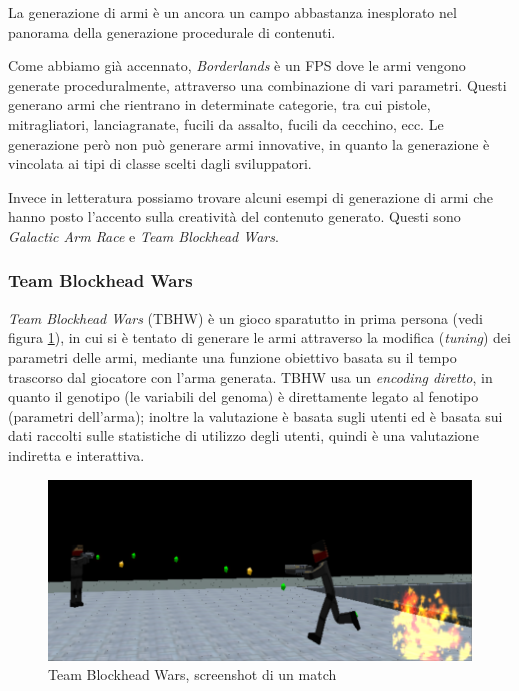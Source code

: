 \documentclass[12pt, italian]{toptesi}
\begin{document}
La generazione di armi è un ancora un campo abbastanza inesplorato nel panorama della generazione procedurale di contenuti.

Come abbiamo già accennato, \emph{Borderlands} è un FPS dove le armi vengono generate proceduralmente, attraverso una combinazione di vari parametri.
Questi generano armi che rientrano in determinate categorie, tra cui pistole, mitragliatori, lanciagranate, fucili da assalto, fucili da cecchino, ecc.
Le generazione però non può generare armi innovative, in quanto la generazione è vincolata ai tipi di classe scelti dagli sviluppatori.

Invece in letteratura possiamo trovare alcuni esempi di generazione di armi che hanno posto l'accento sulla creatività del contenuto generato.
Questi sono \emph{Galactic Arm Race} e \emph{Team Blockhead Wars}.

\subsubsection{Team Blockhead Wars}
\emph{Team Blockhead Wars} (TBHW) \cite{tbhw:article} è un gioco sparatutto in prima persona (vedi figura \ref{fig:tbhw}), in cui si è tentato di generare le armi attraverso la modifica (\emph{tuning}) dei parametri delle armi,
mediante una funzione obiettivo basata su il tempo trascorso dal giocatore con l'arma generata.
TBHW usa un \emph{encoding diretto}, in quanto il genotipo (le variabili del genoma) è direttamente legato al fenotipo (parametri dell'arma); inoltre la valutazione è basata sugli utenti ed è basata sui dati raccolti sulle statistiche di utilizzo degli utenti, quindi è una valutazione indiretta e interattiva.

\begin{figure}

\centering
\includegraphics[width=1.0\textwidth]{TBHW_2}
\caption{Team Blockhead Wars, screenshot di un match}
\label{fig:tbhw}

\end{figure}
\end{document}
